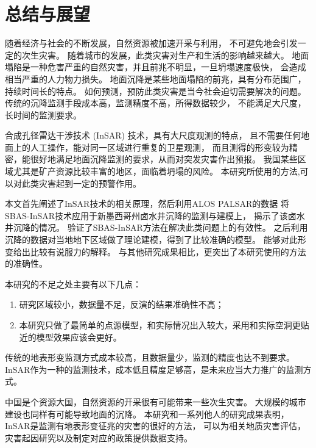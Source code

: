 \chapter{总结与展望}
随着经济与社会的不断发展，自然资源被加速开采与利用，
不可避免地会引发一定的次生灾害。
随着城市的发展，此类灾害对生产和生活的影响越来越大。
地面塌陷是一种危害严重的自然灾害，并且前兆不明显，一旦坍塌速度极快，
会造成相当严重的人力物力损失。
地面沉降是某些地面塌陷的前兆，具有分布范围广，持续时间长的特点。
如何预测，预防此类灾害是当今社会迫切需要解决的问题。
传统的沉降监测手段成本高，监测精度不高，所得数据较少，
不能满足大尺度，长时间的监测要求。

合成孔径雷达干涉技术 (InSAR) 技术，具有大尺度观测的特点，
且不需要任何地面上的人工操作，能对同一区域进行重复的卫星观测，
而且测得的形变较为精密，能很好地满足地面沉降监测的要求，从而对突发灾害作出预报。
我国某些区域尤其是矿产资源比较丰富的地区，面临着坍塌的风险。
本研究所使用的方法,可以对此类灾害起到一定的预警作用。

本文首先阐述了InSAR技术的相关原理，然后利用ALOS PALSAR的数据
将SBAS-InSAR技术应用于新墨西哥州卤水井沉降的监测与建模上，
揭示了该卤水井沉降的情况。
验证了SBAS-InSAR方法在解决此类问题上的有效性。
之后利用沉降的数据对当地地下区域做了理论建模，得到了比较准确的模型。
能够对此形变给出比较有说服力的解释。
与其他研究成果相比，更突出了本研究使用的方法的准确性。

本研究的不足之处主要有以下几点：
\begin{enumerate}
    \item 研究区域较小，数据量不足，反演的结果准确性不高；
    \item 本研究只做了最简单的点源模型，和实际情况出入较大，采用和实际空洞更贴近的模型效果应该会更好。
\end{enumerate}

传统的地表形变监测方式成本较高，且数据量少，监测的精度也达不到要求。
InSAR作为一种的监测技术，成本低且精度足够高，是未来应当大力推广的监测方式。

中国是个资源大国，自然资源的开采很有可能带来一些次生灾害。
大规模的城市建设也同样有可能导致地面的沉降。
本研究和一系列他人的研究成果表明，InSAR是监测有地表形变征兆的灾害的很好的方法，
可以为相关地质灾害评估，灾害起因研究以及制定对应的政策提供数据支持。